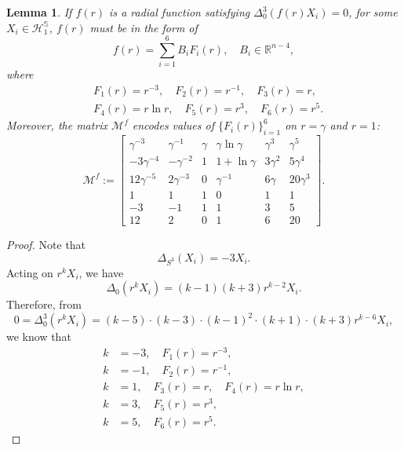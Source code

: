 \documentclass[11pt,letterpaper]{amsart}
\newcommand{\mM}{\mathcal{M}}
\newcommand{\bR}{\mathbb{R}}
\newcommand{\bS}{\mathbb{S}}
\newtheorem{lemma}[theorem]{Lemma}
\theoremstyle{definition}
\theoremstyle{remark}
\numberwithin{equation}{section}
\begin{document}
\begin{lemma}\label{f}
    If $f(r)$ is a radial function satisfying $\Delta_0^3 (f(r)X_i)=0$, for some $X_i\in \mathcal{H}^{\bS}_{1}$, $f(r)$ must be in the form of
    \begin{equation}
        f(r)=\sum_{i=1}^{6}B_i F_i(r), \quad B_i\in \bR^{n-4},
    \end{equation}
where
\begin{equation*}
    \begin{split}
        &F_1(r)=r^{-3}, \quad F_2(r)=r^{-1}, \quad F_3(r)=r,\\
        &F_4(r)=r\ln r, \quad F_5(r)=r^3, \quad F_6(r)=r^5.
    \end{split}
\end{equation*}
Moreover, the matrix $\mM^{f}$ encodes values of $\{F_i(r)\}_{i=1}^{6}$ on $r=\gamma$ and $r=1$:
\begin{equation}\label{Mf}
\mM^{f}:=\begin{bmatrix}
\gamma^{-3} & \gamma^{-1} &  \gamma & \gamma \ln \gamma & \gamma^3& \gamma^5\\
-3\gamma^{-4} & -\gamma^{-2} & 1 & 1+\ln \gamma & 3\gamma^2& 5\gamma^4\\
12\gamma^{-5} & 2\gamma^{-3} & 0 & \gamma^{-1} & 6 \gamma& 20\gamma^3\\
1 & 1 & 1 & 0 & 1& 1\\
-3 & -1 & 1 & 1 & 3& 5\\
12 & 2 & 0 & 1 & 6& 20
\end{bmatrix}.
\end{equation}


\end{lemma}
\begin{proof}
    Note that
    \begin{equation*}
        \Delta_{S^3}(X_i)=-3X_i.
    \end{equation*}
Acting on $r^kX_i$, we have
\begin{equation*}
    \Delta_0 (r^kX_i)=(k-1)(k+3)r^{k-2}X_i.
\end{equation*}
Therefore, from
\begin{equation*}
    0=\Delta^3_0 (r^kX_i)=(k-5)\cdot(k-3)\cdot(k-1)^2\cdot(k+1)\cdot(k+3)r^{k-6}X_i,
\end{equation*}
we know that
\begin{equation*}
    \begin{split}
        k&=-3, \quad F_1(r)=r^{-3},\\
        k&=-1, \quad F_2(r)=r^{-1},\\
        k&=1, \quad F_3(r)=r, \quad F_4(r)=r\ln r,\\
        k&=3, \quad F_5(r)=r^3,\\
        k&=5, \quad F_6(r)=r^5.
    \end{split}
\end{equation*}
\end{proof}
\end{document}
